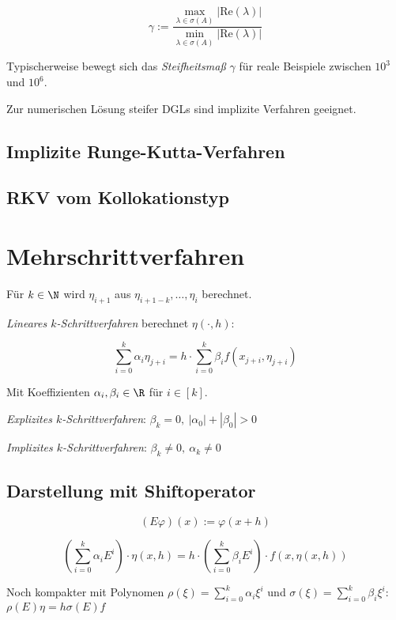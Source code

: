 $$\gamma := \frac{\max_{\lambda \in \sigma(A)}{|\text{Re}(\lambda)|}}{\min_{\lambda \in \sigma(A)}{|\text{Re}(\lambda)|}}$$

Typischerweise bewegt sich das \emph{Steifheitsmaß} $\gamma$ für reale Beispiele zwischen ${10}^3$ und ${10}^6$.

\spacing

Zur numerischen Lösung steifer DGLs sind implizite Verfahren geeignet.

\subsection*{Implizite Runge-Kutta-Verfahren}

\subsection*{RKV vom Kollokationstyp}

\section*{Mehrschrittverfahren}

Für $k \in \N$ wird $\eta_{i+1}$ aus $\eta_{i+1-k},\dots,\eta_i$ berechnet.

\emph{Lineares $k$-Schrittverfahren} berechnet $\eta(\cdot,h)$:

$$\sum_{i=0}^k \alpha_i \eta_{j+i} = h \cdot \sum_{i=0}^k \beta_i f(x_{j+i},\eta_{j+i})$$

Mit Koeffizienten $\alpha_i, \beta_i \in \R$ für $i \in [k]$.

\spacing

\emph{Explizites $k$-Schrittverfahren}: $\beta_k = 0, \ |\alpha_0|+|\beta_0| > 0$

\emph{Implizites $k$-Schrittverfahren}: $\beta_k \neq 0, \ \alpha_k \neq 0$

\subsection*{Darstellung mit Shiftoperator}

$$(E\varphi)(x) := \varphi(x+h)$$

\vspace*{-4mm}

$$\left(\sum_{i=0}^k \alpha_i E^i\right) \cdot \eta(x,h) = h \cdot \left(\sum_{i=0}^k \beta_i  E^i\right) \cdot f(x,\eta(x,h))$$

Noch kompakter mit Polynomen $\rho(\xi) = \sum_{i=0}^k \alpha_i \xi^i$ und $\sigma(\xi) = \sum_{i=0}^k \beta_i \xi^i$: $\rho(E)\eta = h \sigma(E) f$

